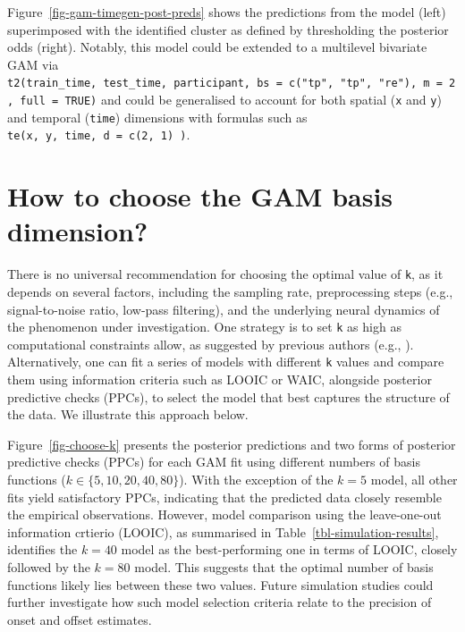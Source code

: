 \documentclass[
  doc,
  floatsintext,
  longtable,
  a4paper,
  nolmodern,
  notxfonts,
  notimes,
  colorlinks=true,linkcolor=blue,citecolor=blue,urlcolor=blue]{apa7}
\begin{document}
\setlength{\parindent}{0pt}
\setlength{\parskip}{6pt}

Figure~\ref{fig-gam-timegen-post-preds} shows the predictions from the
model (left) superimposed with the identified cluster as defined by
thresholding the posterior odds (right). Notably, this model could be
extended to a multilevel bivariate GAM via
\texttt{t2(train\_time,\ test\_time,\ participant,\ bs\ =\ c("tp",\ "tp",\ "re"),\ m\ =\ 2,\ full\ =\ TRUE)}
and could be generalised to account for both spatial (\texttt{x} and
\texttt{y}) and temporal (\texttt{time}) dimensions with formulas such
as \texttt{te(x,\ y,\ time,\ d\ =\ c(2,\ 1)\ )}.

\newpage

\section{How to choose the GAM basis dimension?}\label{apx-basis}

\setlength{\parindent}{0pt}
\setlength{\parskip}{6pt}

There is no universal recommendation for choosing the optimal value of
\texttt{k}, as it depends on several factors, including the sampling
rate, preprocessing steps (e.g., signal-to-noise ratio, low-pass
filtering), and the underlying neural dynamics of the phenomenon under
investigation. One strategy is to set \texttt{k} as high as
computational constraints allow, as suggested by previous authors (e.g.,
).
Alternatively, one can fit a series of models with different \texttt{k}
values and compare them using information criteria such as LOOIC or
WAIC, alongside posterior predictive checks (PPCs), to select the model
that best captures the structure of the data. We illustrate this
approach below.

\setlength{\parindent}{0pt}
\setlength{\parskip}{6pt}

Figure~\ref{fig-choose-k} presents the posterior predictions and two
forms of posterior predictive checks (PPCs) for each GAM fit using
different numbers of basis functions (\(k \in \{5, 10, 20, 40, 80\}\)).
With the exception of the \(k=5\) model, all other fits yield
satisfactory PPCs, indicating that the predicted data closely resemble
the empirical observations. However, model comparison using the
leave-one-out information crtierio (LOOIC), as summarised in
Table~\ref{tbl-simulation-results}, identifies the \(k=40\) model as the
best-performing one in terms of LOOIC, closely followed by the \(k=80\)
model. This suggests that the optimal number of basis functions likely
lies between these two values. Future simulation studies could further
investigate how such model selection criteria relate to the precision of
onset and offset estimates.
\end{document}
